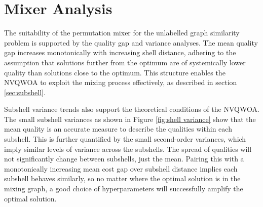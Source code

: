 \section{Mixer Analysis}\label{sec:mixer discussion}
The suitability of the permutation mixer for the unlabelled graph similarity problem is supported by the quality gap and variance analyses. The mean quality gap increases monotonically with increasing shell distance, adhering to the assumption that solutions further from the optimum are of systemically lower quality than solutions close to the optimum. This structure enables the NVQWOA to exploit the mixing process effectively, as described in section \ref{sec:subshell}.

Subshell variance trends also support the theoretical conditions of the NVQWOA. The small subshell variances as shown in Figure \ref{fig:shell variance} show that the mean quality is an accurate measure to describe the qualities within each subshell. This is further quantified by the small second-order variances, which imply similar levels of variance across the subshells. The spread of qualities will not significantly change between subshells, just the mean. Pairing this with a monotonically increasing mean cost gap over subshell distance implies each subshell behaves similarly, so no matter where the optimal solution is in the mixing graph, a good choice of hyperparameters will successfully amplify the optimal solution.